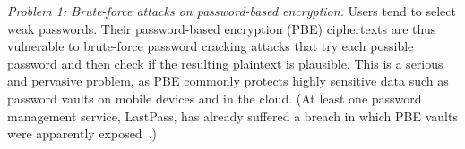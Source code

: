 
\begin{newitemize} 

\item{\em Problem 1: Brute-force attacks on password-based encryption.} Users tend to select weak
passwords. Their password-based encryption (PBE) ciphertexts are thus vulnerable
to brute-force password cracking attacks that try each possible password and
then check if the resulting plaintext is plausible.  This is a serious and
pervasive problem, as PBE commonly protects highly sensitive data such as
password vaults on mobile devices and in the cloud. (At least one password
management service, LastPass, has already suffered a breach in which PBE vaults
were apparently exposed~\cite{}.) 
%





\end{newitemize}
